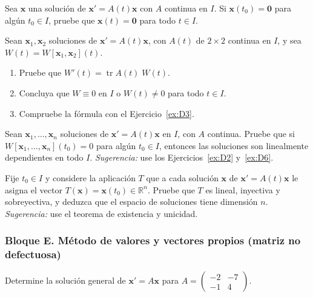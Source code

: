 \begin{exercise}[\est{2}]\label{ex:D6}
Sea $\mathbf{x}$ una solución de $\mathbf{x}' = A(t)\mathbf{x}$ con $A$ continua en $I$. Si $\mathbf{x}(t_0) = \mathbf{0}$ para algún $t_0 \in I$, pruebe que $\mathbf{x}(t) = \mathbf{0}$ para todo $t \in I$.
\end{exercise}

\begin{exercise}[\est{3}]\label{ex:D7}
Sean $\mathbf{x}_1,\mathbf{x}_2$ soluciones de $\mathbf{x}' = A(t)\mathbf{x}$, con $A(t)$ de $2\times 2$ continua en $I$, y sea $W(t) = W[\mathbf{x}_1,\mathbf{x}_2](t)$.
\begin{enumerate}[a]
    \item Pruebe que $W'(t) = \operatorname{tr}A(t)\; W(t)$.
    \item Concluya que $W \equiv 0$ en $I$ o $W(t) \ne 0$ para todo $t \in I$.
    \item Compruebe la fórmula con el Ejercicio~\ref{ex:D3}.
\end{enumerate}
\end{exercise}

\begin{exercise}[\est{3}]\label{ex:D8}
Sean $\mathbf{x}_1,\dots,\mathbf{x}_n$ soluciones de $\mathbf{x}' = A(t)\mathbf{x}$ en $I$, con $A$ continua. Pruebe que si $W[\mathbf{x}_1,\dots,\mathbf{x}_n](t_0) = 0$ para algún $t_0 \in I$, entonces las soluciones son linealmente dependientes en todo $I$. \emph{Sugerencia:} use los Ejercicios~\ref{ex:D2} y~\ref{ex:D6}.
\end{exercise}

\begin{exercise}[\est{3}]\label{ex:D9}
Fije $t_0 \in I$ y considere la aplicación $T$ que a cada solución $\mathbf{x}$ de $\mathbf{x}' = A(t)\mathbf{x}$ le asigna el vector $T(\mathbf{x}) = \mathbf{x}(t_0) \in \mathbb{R}^n$. Pruebe que $T$ es lineal, inyectiva y sobreyectiva, y deduzca que el espacio de soluciones tiene dimensión $n$. \emph{Sugerencia:} use el teorema de existencia y unicidad.
\end{exercise}

\subsubsection*{Bloque E. Método de valores y vectores propios (matriz no defectuosa)}

\begin{exercise}[\est{1}]\label{ex:E1}
Determine la solución general de $\mathbf{x}' = A\mathbf{x}$ para $A = \begin{pmatrix} -2 & -7\\ -1 & 4\end{pmatrix}$.
\end{exercise}

